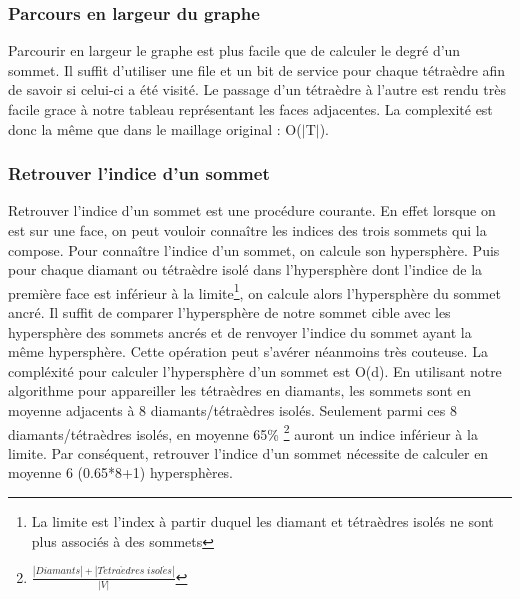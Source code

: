 \subsubsection{Parcours en largeur du graphe}
\noindent
Parcourir en largeur le graphe est plus facile que de calculer le degré d'un sommet. Il suffit d'utiliser une file et un bit de service pour chaque tétraèdre afin de savoir si celui-ci a été visité. Le passage d'un tétraèdre à l'autre est rendu très facile grace à notre tableau représentant les faces adjacentes. La complexité est donc la même que dans le maillage original : O($|$T$|$).
\subsubsection{Retrouver l'indice d'un sommet}
\label{Retrouver l'indice d'un sommet}
\noindent
Retrouver l'indice d'un sommet est une procédure courante. En effet lorsque on est sur une face, on peut vouloir connaître les indices des trois sommets qui la compose. Pour connaître l'indice d'un sommet, on calcule son hypersphère. Puis pour chaque diamant ou tétraèdre isolé dans l'hypersphère dont l'indice de la première face est inférieur à la limite\footnote{La limite est l'index à partir duquel les diamant et tétraèdres isolés ne sont plus associés à des sommets}, on calcule alors l'hypersphère du sommet ancré. Il suffit de comparer l'hypersphère de notre sommet cible avec les hypersphère des sommets ancrés et de renvoyer l'indice du sommet ayant la même hypersphère. Cette opération peut s'avérer néanmoins très couteuse. La compléxité pour calculer l'hypersphère d'un sommet est O(d). En utilisant notre algorithme pour appareiller les tétraèdres en diamants, les sommets sont en moyenne adjacents à 8 diamants/tétraèdres isolés. Seulement parmi ces 8 diamants/tétraèdres isolés, en moyenne 65\% \footnote{$\frac{|Diamants|+|T\acute{e}tra\grave{e}dres\; isol\acute{e}s|}{|V|}$} auront un indice inférieur à la limite. Par conséquent, retrouver l'indice d'un sommet nécessite de calculer en moyenne 6 (0.65*8+1) hypersphères.

% 
% 

